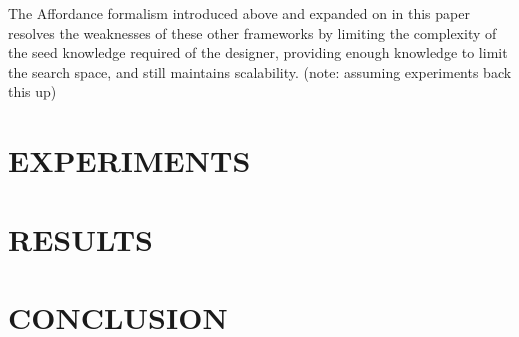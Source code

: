 The Affordance formalism introduced above and expanded on in this paper resolves the weaknesses of these other frameworks by limiting the complexity of the seed knowledge required of the designer, providing enough knowledge to limit the search space, and still maintains scalability. (note: assuming experiments back this up)


\section{EXPERIMENTS}

\section{RESULTS}

\section{CONCLUSION}

